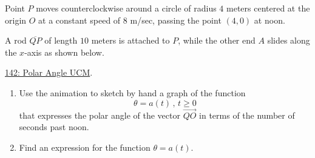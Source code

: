 \documentclass{ximera}
\begin{document}
\begin{question} \label{QOERE34rd}

Point $P$ moves counterclockwise around a circle of radius $4$ meters centered at the origin $O$ at a constant speed of $8$ m/sec, passing the point $(4,0)$ at noon.


A rod $\overline{QP}$ of length $10$ meters is attached to $P$, while the other end $A$ slides along the $x$-axis as shown below. 
 
\href{https://www.desmos.com/calculator/jec1aoz1l3}{142: Polar Angle UCM}.

 
\begin{onlineOnly}
    \begin{center}
\end{center}
\end{onlineOnly}


\begin{enumerate}

\item Use the animation to sketch by hand a graph of the function
\[
    \theta = a(t) \, , \, t\geq 0
\]
that expresses the polar angle of the vector $\overrightarrow{QO}$ in terms of the number of seconds past noon.

\item Find an expression for the function $\theta = a(t)$.

\end{enumerate}
\end{question}
\end{document}
